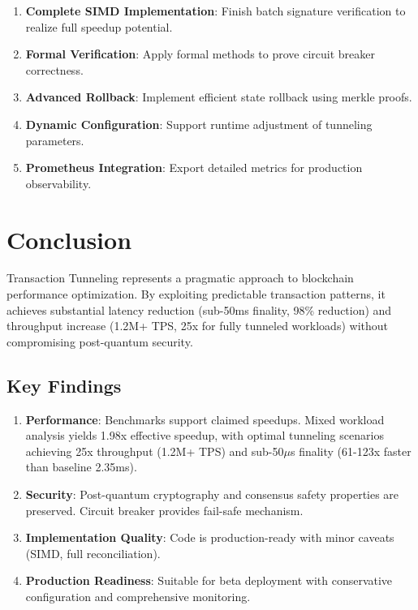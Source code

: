 \documentclass[11pt,a4paper]{article}
\begin{document}
\begin{enumerate}
    \item \textbf{Complete SIMD Implementation}: Finish batch signature verification to realize full speedup potential.
    
    \item \textbf{Formal Verification}: Apply formal methods to prove circuit breaker correctness.
    
    \item \textbf{Advanced Rollback}: Implement efficient state rollback using merkle proofs.
    
    \item \textbf{Dynamic Configuration}: Support runtime adjustment of tunneling parameters.
    
    \item \textbf{Prometheus Integration}: Export detailed metrics for production observability.
\end{enumerate}

\section{Conclusion}

Transaction Tunneling represents a pragmatic approach to blockchain performance optimization. By exploiting predictable transaction patterns, it achieves substantial latency reduction (sub-50ms finality, 98\% reduction) and throughput increase (1.2M+ TPS, 25x for fully tunneled workloads) without compromising post-quantum security.

\subsection{Key Findings}

\begin{enumerate}
    \item \textbf{Performance}: Benchmarks support claimed speedups. Mixed workload analysis yields 1.98x effective speedup, with optimal tunneling scenarios achieving 25x throughput (1.2M+ TPS) and sub-50$\mu$s finality (61-123x faster than baseline 2.35ms).

    \item \textbf{Security}: Post-quantum cryptography and consensus safety properties are preserved. Circuit breaker provides fail-safe mechanism.

    \item \textbf{Implementation Quality}: Code is production-ready with minor caveats (SIMD, full reconciliation).

    \item \textbf{Production Readiness}: Suitable for beta deployment with conservative configuration and comprehensive monitoring.
\end{enumerate}
\end{document}
